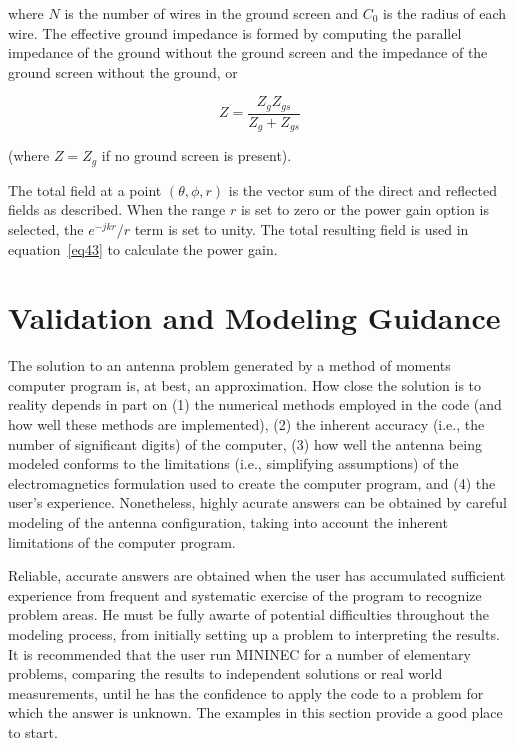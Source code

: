 \documentclass[12pt]{article}
\begin{document}
where $N$ is the number of wires in the ground screen and $C_0$ is the
radius of each wire. The effective ground impedance is formed by
computing the parallel impedance of the ground without the ground screen
and the impedance of the ground screen without the ground, or

\begin{equation}
Z = \frac{Z_g Z_{gs}}{Z_g + Z_{gs}}
\label{eq56}
\end{equation}

(where $Z=Z_g$ if no ground screen is present).

The total field at a point $(\theta,\phi,r)$ is the vector sum of the
direct and reflected fields as described. When the range $r$
is set to zero or the power gain option is selected, the
$e^{-jkr} / r$ term is set to unity. The total resulting field is used
in equation~\eqref{eq43} to calculate the power gain.

\section{Validation and Modeling Guidance}
\label{sec-validation}
The solution to an antenna problem generated by a method of moments
computer program is, at best, an approximation. How close the solution
is to reality depends in part on (1) the numerical methods employed in
the code (and how well these methods are implemented), (2) the inherent
accuracy (i.e., the number of significant digits) of the computer, (3)
how well the antenna being modeled conforms to the limitations (i.e.,
simplifying assumptions) of the electromagnetics formulation used to
create the computer program, and (4) the user's experience. Nonetheless,
highly acurate answers can be obtained by careful modeling of the
antenna configuration, taking into account the inherent limitations of
the computer program.

Reliable, accurate answers are obtained when the user has accumulated
sufficient experience from frequent and systematic exercise of the
program to recognize problem areas. He must be fully awarte of potential
difficulties throughout the modeling process, from initially setting up
a problem to interpreting the results. It is recommended that the user
run MININEC for a number of elementary problems, comparing the results
to independent solutions or real world measurements, until he has the
confidence to apply the code to a problem for which the answer is
unknown. The examples in this section provide a good place to start.
\end{document}
